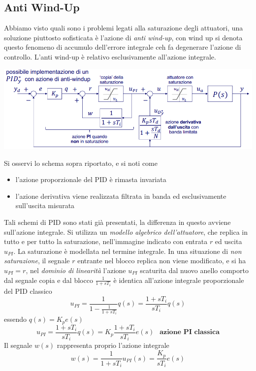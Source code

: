 \documentclass[10pt, letterpaper]{report}
\begin{document}
\subsection{Anti Wind-Up}
Abbiamo visto quali sono i problemi legati alla saturazione degli attuatori, una soluzione piuttosto sofisticata è l'azione di \textit{anti wind-up}, con wind up si denota questo fenomeno di accumulo dell'errore integrale ceh fa degenerare l'azione di controllo. 
L'anti wind-up è relativo esclusivamente all'azione integrale.\begin{center}
    \includegraphics[width=\textwidth]{images/antiWindUp1.png}
\end{center}
Si osservi lo schema sopra riportato, e si noti come \begin{itemize}
    \item l'azione proporzionale del PID è rimasta invariata 
    \item l'azione derivativa viene realizzata filtrata in banda ed esclusivamente sull'uscita misurata 
\end{itemize}
Tali schemi di PID sono stati già presentati, la differenza in questo avviene sull'azione integrale. Si utilizza un \textit{modello algebrico dell'attuatore}, che replica in tutto e per tutto la saturazione, nell'immagine indicato con entrata $r$ ed uscita $u_{PI}$.\acc 
La saturazione è modellata nel termine integrale.\acc 
In una situazione di \textit{non saturazione}, il segnale $r$ entrante nel blocco replica non viene modificato, e si ha $u_{PI}=r$, nel \textit{dominio di linearità} l'azione $u_{PI}$ scaturita dal nuovo anello comporto dal segnale copia e dal blocco $\frac{1}{1+sT_i}$ è identica all'azione integrale proporzionale del PID classico
$$ u_{PI}=\frac{1}{1-\frac{1}{1+sT_i}}q(s)=\frac{1+sT_i}{sT_i}q(s)$$
essendo $q(s)=K_pe(s)$
$$ u_{PI}=\frac{1+sT_i}{sT_i}q(s)=K_p\frac{1+sT_i}{sT_i}e(s) \ \ \textbf{ azione PI classica}$$
Il segnale $w(s)$ rappresenta proprio l'azione integrale 
$$ w(s)=\frac{1}{1+sT_i}u_{PI}(s)=\frac{K_p}{sT_i}e(s)$$
\end{document}
